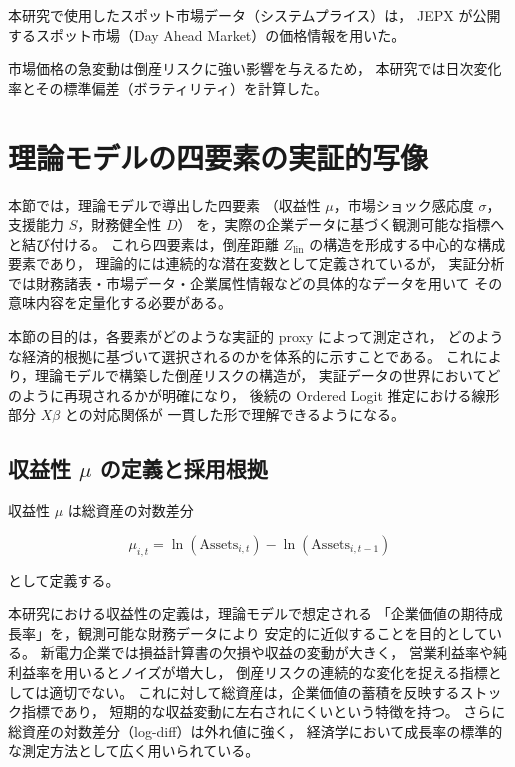 本研究で使用したスポット市場データ（システムプライス）は，
JEPX が公開するスポット市場（Day Ahead Market）の価格情報を用いた。

市場価格の急変動は倒産リスクに強い影響を与えるため，
本研究では日次変化率とその標準偏差（ボラティリティ）を計算した。


\section{理論モデルの四要素の実証的写像}

本節では，理論モデルで導出した四要素
（収益性 $\mu$，市場ショック感応度 $\sigma$，支援能力 $S$，財務健全性 $D$）
を，実際の企業データに基づく観測可能な指標へと結び付ける。
これら四要素は，倒産距離 $Z_{\text{lin}}$ の構造を形成する中心的な構成要素であり，
理論的には連続的な潜在変数として定義されているが，
実証分析では財務諸表・市場データ・企業属性情報などの具体的なデータを用いて
その意味内容を定量化する必要がある。

本節の目的は，各要素がどのような実証的 proxy によって測定され，
どのような経済的根拠に基づいて選択されるのかを体系的に示すことである。
これにより，理論モデルで構築した倒産リスクの構造が，
実証データの世界においてどのように再現されるかが明確になり，
後続の Ordered Logit 推定における線形部分 $X\beta$ との対応関係が
一貫した形で理解できるようになる。


\subsection{収益性 $\mu$ の定義と採用根拠}

収益性 $\mu$ は総資産の対数差分



\[
\mu_{i,t} = \ln(\text{Assets}_{i,t}) - \ln(\text{Assets}_{i,t-1})
\]



として定義する。

本研究における収益性の定義は，理論モデルで想定される
「企業価値の期待成長率」を，観測可能な財務データにより
安定的に近似することを目的としている。
新電力企業では損益計算書の欠損や収益の変動が大きく，
営業利益率や純利益率を用いるとノイズが増大し，
倒産リスクの連続的な変化を捉える指標としては適切でない。
これに対して総資産は，企業価値の蓄積を反映するストック指標であり，
短期的な収益変動に左右されにくいという特徴を持つ。
さらに総資産の対数差分（log-diff）は外れ値に強く，
経済学において成長率の標準的な測定方法として広く用いられている。


